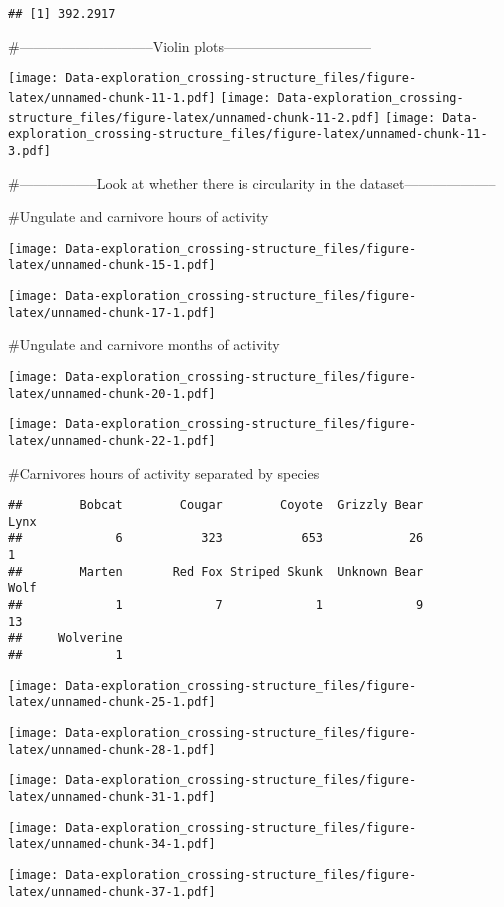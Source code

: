 \documentclass[]{article}
\begin{document}
\begin{verbatim}
## [1] 392.2917
\end{verbatim}

\#-----------------------------Violin
plots--------------------------------

\texttt{[image: Data-exploration\_crossing-structure\_files/figure-latex/unnamed-chunk-11-1.pdf]}
\texttt{[image: Data-exploration\_crossing-structure\_files/figure-latex/unnamed-chunk-11-2.pdf]}
\texttt{[image: Data-exploration\_crossing-structure\_files/figure-latex/unnamed-chunk-11-3.pdf]}

\#-----------------Look at whether there is circularity in the
dataset--------------------

\#Ungulate and carnivore hours of activity

\texttt{[image: Data-exploration\_crossing-structure\_files/figure-latex/unnamed-chunk-15-1.pdf]}

\texttt{[image: Data-exploration\_crossing-structure\_files/figure-latex/unnamed-chunk-17-1.pdf]}

\#Ungulate and carnivore months of activity

\texttt{[image: Data-exploration\_crossing-structure\_files/figure-latex/unnamed-chunk-20-1.pdf]}

\texttt{[image: Data-exploration\_crossing-structure\_files/figure-latex/unnamed-chunk-22-1.pdf]}

\#Carnivores hours of activity separated by species

\begin{verbatim}
##        Bobcat        Cougar        Coyote  Grizzly Bear          Lynx 
##             6           323           653            26             1 
##        Marten       Red Fox Striped Skunk  Unknown Bear          Wolf 
##             1             7             1             9            13 
##     Wolverine 
##             1
\end{verbatim}

\texttt{[image: Data-exploration\_crossing-structure\_files/figure-latex/unnamed-chunk-25-1.pdf]}

\texttt{[image: Data-exploration\_crossing-structure\_files/figure-latex/unnamed-chunk-28-1.pdf]}

\texttt{[image: Data-exploration\_crossing-structure\_files/figure-latex/unnamed-chunk-31-1.pdf]}

\texttt{[image: Data-exploration\_crossing-structure\_files/figure-latex/unnamed-chunk-34-1.pdf]}

\texttt{[image: Data-exploration\_crossing-structure\_files/figure-latex/unnamed-chunk-37-1.pdf]}
\end{document}
